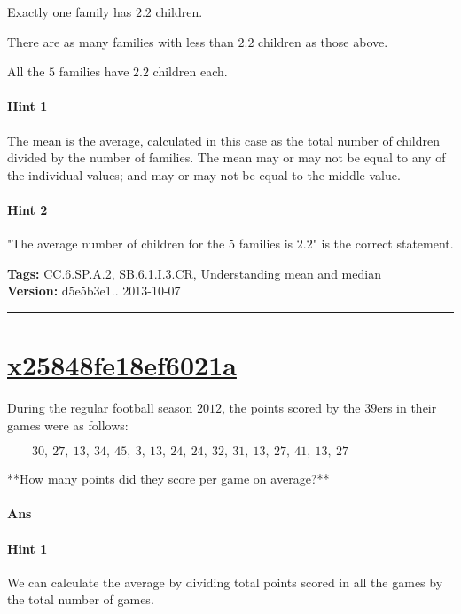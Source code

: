 \documentclass[twocolumn,10pt]{article}
\begin{document}
Exactly one family has $2.2$ children.

There are as many families with less than $2.2$ children as those above.


 All the $5$ families have $2.2$ children each.



\paragraph{Hint 1}The mean is the average, calculated in this case as the total number of children divided by the number of families.  The mean may or may not be equal to any of the individual values; and may or may not be equal to the middle value.

\paragraph{Hint 2}"The average number of children for the $5$ families is $2.2$" is the correct statement.



\medskip
\noindent
\textbf{Tags:} {\footnotesize CC.6.SP.A.2, SB.6.1.I.3.CR, Understanding mean and median}\\
\textbf{Version:} d5e5b3e1.. 2013-10-07
\smallskip\hrule





\section{\href{https://www.khanacademy.org/devadmin/content/items/x25848fe18ef6021a}{x25848fe18ef6021a}}

\noindent
During the regular football season $2012$, the points scored by the $39$ers in their games were as follows:

$\qquad30,~27,~13,~34,~45,~3,~13,~24,~24,~32,~31,~13,~27,~41,~13,~27$

**How many points did they score per game on average?**

\paragraph{Ans} 

\paragraph{Hint 1}We can calculate the average by dividing total points scored in all the games by the total number of games.
\end{document}
